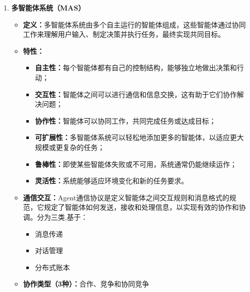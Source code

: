 \documentclass[../main.tex]{subfiles}
\begin{document}
\begin{enumerate}
\begin{itemize}
        \item \textbf{要素化表示：}一个状态中包含多个要素（原子），即多个变量和特征的集合。相关内容：约束满足算法、命题逻辑、规划、Bayesian网、机器学习算法；
        \item \textbf{结构化表示：}一个状态包含对象，每个对象可能有自身的特征值，以及与其他对象的关系。相关内容：关系数据库、一阶逻辑、一阶概率模型、基于知识的学习、自然语言理解。
    \end{itemize}
    \item \textbf{多智能体系统（MAS）}
    \begin{itemize}
        \item \textbf{定义：}多智能体系统由多个自主运行的智能体组成，这些智能体通过协同工作来理解用户输入、制定决策并执行任务，最终实现共同目标。
        \item \textbf{特性：}
        \begin{itemize}
            \item \textbf{自主性：}每个智能体都有自己的控制结构，能够独立地做出决策和行动；
            \item \textbf{交互性：}智能体之间可以进行通信和信息交换，这有助于它们协作解决问题；
            \item \textbf{协作性：}智能体可以协同工作，共同完成任务或达成目标；
            \item \textbf{可扩展性：}多智能体系统可以轻松地添加更多的智能体，以适应更大规模或更复杂的任务；
            \item \textbf{鲁棒性：}即使某些智能体失败或不可用，系统通常仍能继续运作；
            \item \textbf{灵活性：}系统能够适应环境变化和新的任务要求。
        \end{itemize}
        \item \textbf{通信交互：}Agent通信协议是定义智能体之间交互规则和消息格式的规范，它规定了智能体如何发送，接收和处理信息，以实现有效的协作和协调。分为三类,基于：
        \begin{itemize}
            \item 消息传递
            \item 对话管理
            \item 分布式账本
        \end{itemize}
        \item \textbf{协作类型（3种）：}合作、竞争和协同竞争
        \begin{table}[H]
        \centering
        \caption{多智能体关系类型对比}
\end{table}
\end{itemize}
\end{enumerate}
\end{document}
